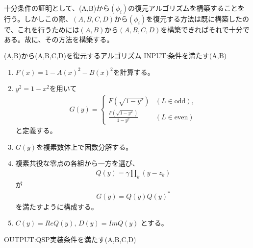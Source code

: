 \documentclass[a4paper,10.5pt]{article}
\numberwithin{equation}{section}
\begin{document}
十分条件の証明として、(A,B)から$(\phi_{i})$の復元アルゴリズムを構築することを行う。しかしこの際、$(A,B,C,D)$から$(\phi_{i})$を復元する方法は既に構築したので、これを行うためには$(A,B)$から$(A,B,C,D)$を構築できればそれで十分である。故に、その方法を構築する。
\begin{setupbox}{(A,B)から(A,B,C,D)を復元するアルゴリズム}
INPUT:条件を満たす(A,B)
    \begin{enumerate}
    \item $F(x)=1-A(x)^2-B(x)^2$を計算する。
    \item $y^2=1-x^2$を用いて
    \begin{align*}
        G(y)=
        \begin{cases}
            F(\sqrt{1-y^2})
            &(L\in\mathrm{odd}),\\[1mm]
            \displaystyle
            \frac{F(\sqrt{1-y^2})}{1-y^2}
            &(L\in\mathrm{even})
        \end{cases}
    \end{align*}
    と定義する。
    \item $G(y)$を複素数体上で因数分解する。
    \item 複素共役な零点の各組から一方を選び、
    \begin{align*}
        Q(y)=\gamma\prod_k(y-z_k)
    \end{align*}
    が
    \begin{align*}
        G(y)=Q(y)Q(y)^*
    \end{align*}
    を満たすように構成する。
    \item$C(y)=Re Q(y),\,
        D(y)=Im Q(y)$
    とする。
\end{enumerate}
OUTPUT:QSP実装条件を満たす(A,B,C,D)
\end{setupbox}
\end{document}

